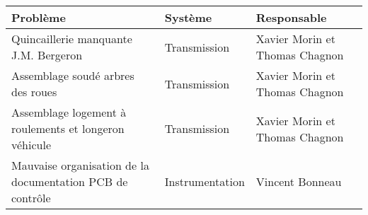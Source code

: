 \begin{tabularx}{\linewidth}{
    |>{\hsize=1.7\hsize}X|%
    >{\hsize=0.5\hsize}X|%
    >{\hsize=0.8\hsize}X|%
  }
    \hline
    \textbf{Problème} & \textbf{Système} & \textbf{Responsable} \\\hline
    Quincaillerie manquante J.M. Bergeron & Transmission & Xavier Morin et Thomas Chagnon\\\hline
    Assemblage soudé arbres des roues & Transmission & Xavier Morin et Thomas Chagnon\\\hline
    Assemblage logement à roulements et longeron véhicule & Transmission & Xavier Morin et Thomas Chagnon\\\hline
    Mauvaise organisation de la documentation PCB de contrôle & Instrumentation & Vincent Bonneau\\\hline
\end{tabularx}
    
    
